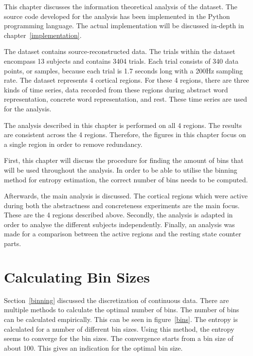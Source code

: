 This chapter discusses the information theoretical analysis of the dataset. The source code developed for the analysis has been implemented in the Python programming language. The actual implementation will be discussed in-depth in chapter~\ref{implementation}. 

The dataset contains source-reconstructed data. The trials within the dataset encompass 13 subjects and contains 3404 trials. Each trial consists of 340 data points, or samples, because each trial is 1.7 seconds long with a 200Hz sampling rate. The dataset represents 4 cortical regions. For these 4 regions, there are three kinds of time series, data recorded from these regions during abstract word representation, concrete word representation, and rest. These time series are used for the analysis.

The analysis described in this chapter is performed on all 4 regions. The results are consistent across the 4 regions. Therefore, the figures in this chapter focus on a single region in order to remove redundancy.

First, this chapter will discuss the procedure for finding the amount of bins that will be used throughout the analysis. In order to be able to utilise the binning method for entropy estimation, the correct number of bins needs to be computed.

Afterwards, the main analysis is discussed. The cortical regions which were active during both the abstractness and concreteness experiments are the main focus. These are the 4 regions described above. Secondly, the analysis is adapted in order to analyse the different subjects  independently. Finally, an analysis was made for a comparison between the active regions and the resting state counter parts.

\section{Calculating Bin Sizes}

Section~\ref{binning} discussed the discretization of continuous data. There are multiple methods to calculate the optimal number of bins. The number of bins can be calculated empirically. This can be seen in figure~\ref{bins}. The entropy is calculated for a number of different bin sizes. Using this method, the entropy seems to converge for the bin sizes. The convergence starts from a bin size of about 100. This gives an indication for the optimal bin size.

